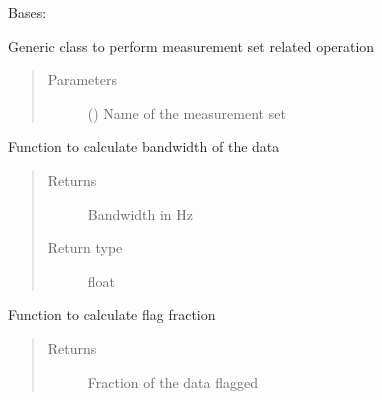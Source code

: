 \documentclass[letterpaper,10pt,english]{sphinxmanual}
\begin{document}
\begin{fulllineitems}
\label{\detokenize{paircars:paircars.access_ms.AccessMS}}
\sphinxAtStartPar
Bases: 

\sphinxAtStartPar
Generic class to perform measurement set related operation
\begin{quote}\begin{description}
\item[{Parameters}] \leavevmode
\sphinxAtStartPar
{} () \textendash{} Name of the measurement set

\end{description}\end{quote}

\begin{fulllineitems}
\label{\detokenize{paircars:paircars.access_ms.AccessMS.calc_bandwidth}}
\sphinxAtStartPar
Function to calculate bandwidth of the data
\begin{quote}\begin{description}
\item[{Returns}] \leavevmode
\sphinxAtStartPar
Bandwidth in Hz

\item[{Return type}] \leavevmode
\sphinxAtStartPar
float

\end{description}\end{quote}

\end{fulllineitems}


\begin{fulllineitems}
\label{\detokenize{paircars:paircars.access_ms.AccessMS.calc_flagfrac}}
\sphinxAtStartPar
Function to calculate flag fraction
\begin{quote}\begin{description}
\item[{Returns}] \leavevmode
\sphinxAtStartPar
Fraction of the data flagged


\end{description}
\end{quote}
\end{fulllineitems}
\end{fulllineitems}
\end{document}
